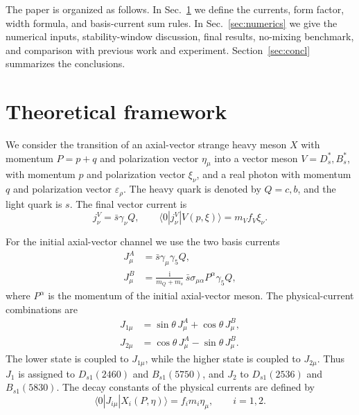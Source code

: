 \documentclass[aps,prd,a4paper,preprint,preprintnumbers,titlepage,
nofootinbib,superscriptaddress]{revtex4-2}
\newcommand{\ii}{\mathrm{i}}
\newcommand{\Dst}{D_s^\ast}
\newcommand{\Dsone}{D_{s1}}
\newcommand{\Bst}{B_s^\ast}
\newcommand{\Bsone}{B_{s1}}
\begin{document}
The paper is organized as follows.  In Sec.~\ref{sec:framework} we define the
currents, form factor, width formula, and basis-current sum rules.  In
Sec.~\ref{sec:numerics} we give the numerical inputs, stability-window
discussion, final results, no-mixing benchmark, and comparison with previous
work and experiment.  Section~\ref{sec:concl} summarizes the conclusions.

\section{Theoretical framework}
\label{sec:framework}

We consider the transition of an axial-vector strange heavy meson \(X\) with
momentum \(P=p+q\) and polarization vector \(\eta_\mu\) into a vector meson
\(V=\Dst,\Bst\), with momentum \(p\) and polarization vector \(\xi_\nu\), and
a real photon with momentum \(q\) and polarization vector \(\varepsilon_\rho\).
The heavy quark is denoted by \(Q=c,b\), and the light quark is \(s\).
The final vector current is
\begin{equation}
  j_\nu^V=\bar s\gamma_\nu Q,\qquad
  \langle0|j_\nu^V|V(p,\xi)\rangle=m_V f_V\xi_\nu .
  \label{eq:vector-current}
\end{equation}

For the initial axial-vector channel we use the two basis currents
\begin{align}
  J_\mu^A &= \bar s\gamma_\mu\gamma_5 Q,\\
  J_\mu^B &= \frac{\ii}{m_Q+m_s}\,
  \bar s\sigma_{\mu\alpha}P^\alpha\gamma_5 Q ,
  \label{eq:basis-currents}
\end{align}
where \(P^\alpha\) is the momentum of the initial axial-vector meson.  The
physical-current combinations are
\begin{align}
  J_{1\mu} &= \sin\theta\,J_\mu^A+\cos\theta\,J_\mu^B,\\
  J_{2\mu} &= \cos\theta\,J_\mu^A-\sin\theta\,J_\mu^B .
  \label{eq:physical-currents}
\end{align}
The lower state is coupled to \(J_{1\mu}\), while the higher state is coupled
to \(J_{2\mu}\).  Thus \(J_1\) is assigned to \(\Dsone(2460)\) and
\(B_{s1}(5750)\), and \(J_2\) to \(\Dsone(2536)\) and \(\Bsone(5830)\).
The decay constants of the physical currents are defined by
\begin{equation}
  \langle0|J_{i\mu}|X_i(P,\eta)\rangle=f_i m_i\eta_\mu,\qquad i=1,2 .
  \label{eq:physical-decay-constants}
\end{equation}
\end{document}
